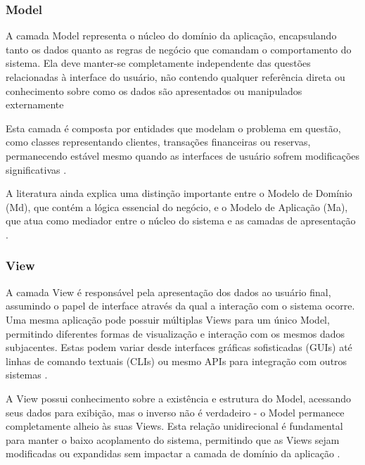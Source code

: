         \subsubsection{Model}
            \par A camada Model representa o núcleo do domínio da aplicação, encapsulando tanto os dados quanto as regras de negócio que comandam o comportamento do sistema. Ela deve manter-se completamente independente das questões relacionadas à interface do usuário, não contendo qualquer referência direta ou conhecimento sobre como os dados são apresentados ou manipulados externamente \cite{artigo:deacon:2009}
            
            \par Esta camada é composta por entidades que modelam o problema em questão, como classes representando clientes, transações financeiras ou reservas, permanecendo estável mesmo quando as interfaces de usuário sofrem modificações significativas \cite{artigo:deacon:2009}. 
            
            \par A literatura ainda explica uma distinção importante entre o Modelo de Domínio (Md), que contém a lógica essencial do negócio, e o Modelo de Aplicação (Ma), que atua como mediador entre o núcleo do sistema e as camadas de apresentação \cite{artigo:deacon:2009}.
            
        \subsubsection{View}
            \par A camada View é responsável pela apresentação dos dados ao usuário final, assumindo o papel de interface através da qual a interação com o sistema ocorre. Uma mesma aplicação pode possuir múltiplas Views para um único Model, permitindo diferentes formas de visualização e interação com os mesmos dados subjacentes. Estas podem variar desde interfaces gráficas sofisticadas (GUIs) até linhas de comando textuais (CLIs) ou mesmo APIs para integração com outros sistemas \cite{artigo:deacon:2009}.
            
            \par A View possui conhecimento sobre a existência e estrutura do Model, acessando seus dados para exibição, mas o inverso não é verdadeiro - o Model permanece completamente alheio às suas Views. Esta relação unidirecional é fundamental para manter o baixo acoplamento do sistema, permitindo que as Views sejam modificadas ou expandidas sem impactar a camada de domínio da aplicação \cite{artigo:deacon:2009}.

